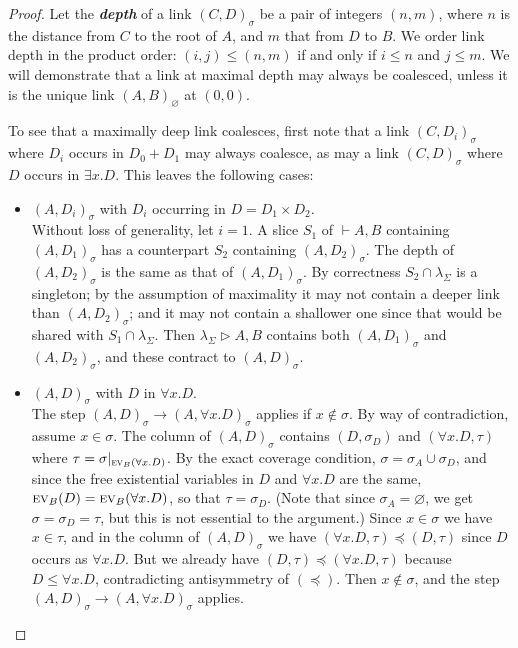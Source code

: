 \documentclass[twoside,a4paper]{article}
\newcommand\defn[1]{\textit{\textbf{#1}}}
\newcommand\ex[2][{}]{\textsc{ev}_{#1}(#2)}
\newcommand\+{+}
\renewcommand\*{\times}
\newcommand\sub{\leq}
\newcommand\dep{\preccurlyeq}
\newcommand\seq[2]{{\vdash}#1,#2}
\newcommand\net[3]{#1\triangleright #2,#3}
\newcommand\res[1]{|_{#1}}
\newcommand\link[3][\sigma]{(#2,#3)_{#1}}
\newcommand\scoal{\rightarrow} %
\begin{document}
\begin{proof}
Let the \defn{depth} of a link $\link CD$ be a pair of integers $(n,m)$, where $n$ is the distance from $C$ to the root of $A$, and $m$ that from $D$ to $B$. We order link depth in the product order: $(i,j)\leq(n,m)$ if and only if $i\leq n$ and $j\leq m$. We will demonstrate that a link at maximal depth may always be coalesced, unless it is the unique link $\link[\varnothing]AB$ at $(0,0)$. 

To see that a maximally deep link coalesces, first note that a link $\link C{D_i}$ where $D_i$ occurs in $D_0{\+}D_1$ may always coalesce, as may a link $\link CD$ where $D$ occurs in $\exists x.D$. This leaves the following cases:
\begin{itemize}
	\item 
$\link A{D_i}$ with $D_i$ occurring in $D=D_1\*D_2$.
\\ 
Without loss of generality, let $i=1$. A slice $S_1$ of $\seq AB$ containing $\link A{D_1}$ has a counterpart $S_2$ containing $\link A{D_2}$. The depth of $\link A{D_2}$ is the same as that of $\link A{D_1}$. By correctness $S_2\cap \lambda_\Sigma$ is a singleton; by the assumption of maximality it may not contain a deeper link than $\link A{D_2}$; and it may not contain a shallower one since that would be shared with $S_1\cap\lambda_\Sigma$. Then $\net{\lambda_\Sigma}AB$ contains both $\link A{D_1}$ and $\link A{D_2}$, and these contract to $\link AD$.
	
	\item 
$\link AD$ with $D$ in $\forall x.D$. 
\\
The step $\link AD\scoal\link A{\forall x.D}$ applies if $x\notin\sigma$. By way of contradiction, assume $x\in\sigma$. The column of $\link AD$ contains $(D,\sigma_D)$ and $(\forall x.D,\tau)$ where $\tau=\sigma\res{\ex[B]{\forall x.D}}$. By the exact coverage condition, $\sigma=\sigma_A\cup\sigma_D$, and since the free existential variables in $D$ and $\forall x.D$ are the same, $\ex[B]D=\ex[B]{\forall x.D}$, so that $\tau=\sigma_D$. (Note that since $\sigma_A=\varnothing$, we get $\sigma=\sigma_D=\tau$, but this is not essential to the argument.) Since $x\in\sigma$ we have $x\in\tau$, and in the column of $\link AD$ we have $(\forall x.D,\tau)\dep(D,\tau)$ since $D$ occurs as $\forall x.D$. But we already have $(D,\tau)\dep(\forall x.D,\tau)$ because $D\sub\forall x.D$, contradicting antisymmetry of $(\dep)$. Then $x\notin\sigma$, and the step $\link AD\scoal\link A{\forall x.D}$ applies.


\end{itemize}
\end{proof}
\end{document}
